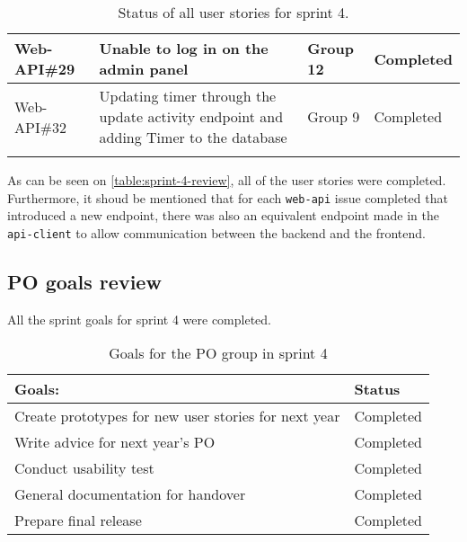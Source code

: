 \begin{longtable}{|p{2.9cm}|p{8cm}|p{2cm}|p{2cm}|}
    Web-API\#29 & Unable to log in on the admin panel                                                                                                                                                       & Group 12     & Completed    \\ \hline
    Web-API\#32 & Updating timer through the update activity endpoint and adding Timer to the database                                                                                                                                                       & Group 9     & Completed    \\ \hline
    \caption{Status of all user stories for sprint 4.}\label{table:sprint-4-review}
\end{longtable}

As can be seen on \autoref{table:sprint-4-review}, all of the user stories were completed. Furthermore, it shoud be mentioned that for each \texttt{web-api} issue completed that introduced a new endpoint, there was also an equivalent endpoint made in the \texttt{api-client} to allow communication between the backend and the frontend.

\subsection{PO goals review}
All the sprint goals for sprint 4 were completed.
\begin{table}[H]
    \centering
    \begin{tabular}{|l|l|}
    \hline
    Goals:  & Status \\ \hline
     Create prototypes for new user stories for next year & Completed\\ \hline
     Write advice for next year's PO  & Completed  \\ \hline
     Conduct usability test & Completed  \\ \hline
     General documentation for handover & Completed \\ \hline
     Prepare final release & Completed  \\ \hline
    \end{tabular}
    \caption{Goals for the PO group in sprint 4}
\end{table}

